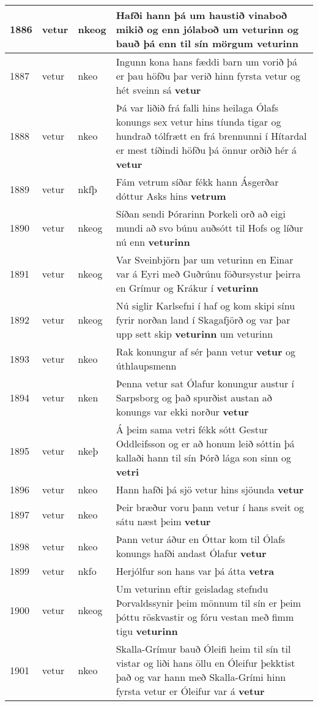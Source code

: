 \documentclass{article}
\begin{document}
\begin{longtable}{p{1cm}|p{1cm}|p{1cm}|p{13cm}}
\hline
1886&vetur&nkeog&Hafði hann þá um haustið vinaboð mikið og enn jólaboð um veturinn og bauð þá enn til sín mörgum \textbf{veturinn} \\
\hline
1887&vetur&nkeo&Ingunn kona hans fæddi barn um vorið þá er þau höfðu þar verið hinn fyrsta vetur og hét sveinn sá \textbf{vetur} \\
\hline
1888&vetur&nkeo&Þá var liðið frá falli hins heilaga Ólafs konungs sex vetur hins tíunda tigar og hundrað tólfrætt en frá brennunni í Hítardal er mest tíðindi höfðu þá önnur orðið hér á \textbf{vetur} \\
\hline
1889&vetur&nkfþ&Fám vetrum síðar fékk hann Ásgerðar dóttur Asks hins \textbf{vetrum} \\
\hline
1890&vetur&nkeog&Síðan sendi Þórarinn Þorkeli orð að eigi mundi að svo búnu auðsótt til Hofs og líður nú enn \textbf{veturinn} \\
\hline
1891&vetur&nkeog&Var Sveinbjörn þar um veturinn en Einar var á Eyri með Guðrúnu föðursystur þeirra en Grímur og Krákur í \textbf{veturinn} \\
\hline
1892&vetur&nkeog&Nú siglir Karlsefni í haf og kom skipi sínu fyrir norðan land í Skagafjörð og var þar upp sett skip \textbf{veturinn} um veturinn\\
\hline
1893&vetur&nkeo&Rak konungur af sér þann vetur \textbf{vetur} og úthlaupsmenn\\
\hline
1894&vetur&nken&Þenna vetur sat Ólafur konungur austur í Sarpsborg og það spurðist austan að konungs var ekki norður \textbf{vetur} \\
\hline
1895&vetur&nkeþ&Á þeim sama vetri fékk sótt Gestur Oddleifsson og er að honum leið sóttin þá kallaði hann til sín Þórð lága son sinn og \textbf{vetri} \\
\hline
1896&vetur&nkeo&Hann hafði þá sjö vetur hins sjöunda \textbf{vetur} \\
\hline
1897&vetur&nkeo&Þeir bræður voru þann vetur í hans sveit og sátu næst þeim \textbf{vetur} \\
\hline
1898&vetur&nkeo&Þann vetur áður en Óttar kom til Ólafs konungs hafði andast Ólafur \textbf{vetur} \\
\hline
1899&vetur&nkfo&Herjólfur son hans var þá átta \textbf{vetra} \\
\hline
1900&vetur&nkeog&Um veturinn eftir geisladag stefndu Þorvaldssynir þeim mönnum til sín er þeim þóttu röskvastir og fóru vestan með fimm tigu \textbf{veturinn} \\
\hline
1901&vetur&nkeo&Skalla-Grímur bauð Óleifi heim til sín til vistar og liði hans öllu en Óleifur þekktist það og var hann með Skalla-Grími hinn fyrsta vetur er Óleifur var á \textbf{vetur} \\

\end{longtable}
\end{document}
